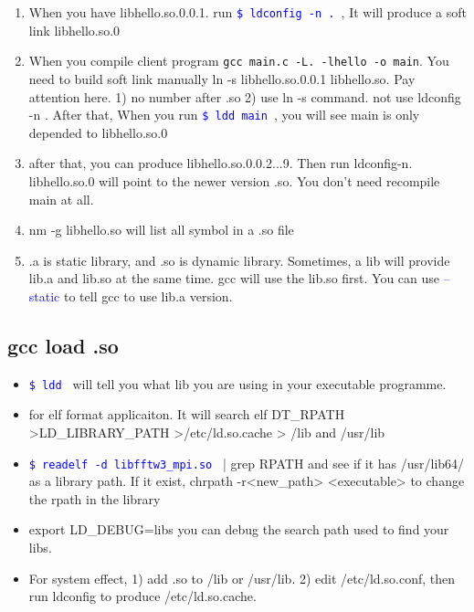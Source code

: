\documentclass[a4paper,12pt,twoside]{book}
\newcommand{\linuxcommand}[1]{\texttt{\textcolor{blue}{\$ #1 \Pisymbol{psy}{191}}}}
\newcommand{\op}[1]{\textcolor{blue}{-#1}}
\begin{document}
\begin{itemize}
\begin{itemize}
\begin{itemize}
\begin{enumerate}
		\item When you have libhello.so.0.0.1. run \linuxcommand{ldconfig -n .}, It will produce a soft link libhello.so.0
		\item When you compile client program
		\verb=gcc main.c -L. -lhello -o main=. You need to build soft link manually 
		ln -s libhello.so.0.0.1 libhello.so. Pay attention here. 1) no number after .so 2) use ln -s command. not use ldconfig -n . After that, When you run \linuxcommand{ldd main}, you will see main is only depended to libhello.so.0
		
		\item after that, you can produce libhello.so.0.0.2...9. Then run ldconfig-n. libhello.so.0 will point to the newer version .so. You don't need recompile main at all.  
		\item nm -g libhello.so will list all symbol in a .so file
		
		  \item .a is static library, and .so is dynamic library. Sometimes, a lib will provide lib.a
        and lib.so at the same time. gcc will use the lib.so first. You can use \op{-static} to tell
        gcc to use lib.a version.
		       
       \end{enumerate}
\end{itemize}
\subsection{gcc load .so}

		\begin{itemize}
  		 \item \linuxcommand{ldd} will tell you what lib you are using in your executable programme.

				\item for elf format applicaiton. It will search elf DT\_RPATH >LD\_LIBRARY\_PATH >/etc/ld.so.cache > /lib and /usr/lib

				\item \linuxcommand{readelf -d libfftw3\_mpi.so} | grep RPATH and see if it has /usr/lib64/ as a library path. If it exist, chrpath -r<new\_path> <executable> to change the rpath in the library 

				\item export LD\_DEBUG=libs you can debug the search path used to find your libs.

				\item For system effect, 1) add .so to /lib or /usr/lib. 2) edit /etc/ld.so.conf, then run ldconfig to produce /etc/ld.so.cache.


\end{itemize}
\end{itemize}
\end{itemize}
\end{document}
